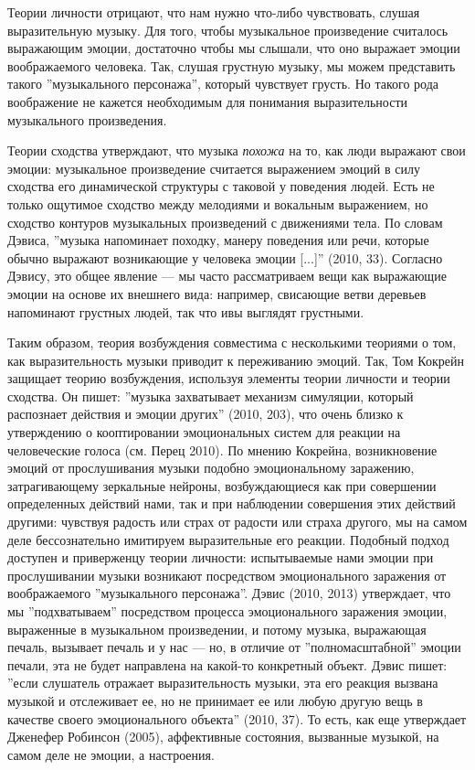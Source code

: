 \documentclass[11pt]{book}
\begin{document}
Теории личности отрицают, что нам нужно что-либо чувствовать, слушая выразительную музыку. Для того, чтобы музыкальное произведение считалось выражающим эмоции, достаточно чтобы мы слышали, что оно выражает эмоции воображаемого человека. Так, слушая грустную музыку, мы можем представить такого ''музыкального персонажа'', который чувствует грусть. Но такого рода воображение не кажется необходимым для понимания выразительности музыкального произведения.

Теории сходства утверждают, что музыка \textit{похожа} на то, как люди выражают свои эмоции: музыкальное произведение считается выражением эмоций в силу сходства его динамической структуры с таковой у поведения людей. Есть не только ощутимое сходство между мелодиями и вокальным выражением, но сходство контуров музыкальных произведений с движениями тела. По словам Дэвиса, ''музыка напоминает походку, манеру поведения или речи, которые обычно выражают возникающие у человека эмоции [...]'' (2010, 33). Согласно Дэвису, это общее явление --- мы часто рассматриваем вещи как выражающие эмоции на основе их внешнего вида: например, свисающие ветви деревьев напоминают грустных людей, так что ивы выглядят грустными.

Таким образом, теория возбуждения совместима с несколькими теориями о том, как выразительность музыки приводит к переживанию эмоций. Так, Том Кокрейн защищает теорию возбуждения, используя элементы теории личности и теории сходства. Он пишет: ''музыка захватывает механизм симуляции, который распознает действия и эмоции других'' (2010, 203), что очень близко к утверждению о кооптировании эмоциональных систем для реакции на человеческие голоса (см. Перец 2010). По мнению Кокрейна, возникновение эмоций от прослушивания музыки подобно эмоциональному заражению, затрагивающему зеркальные нейроны, возбуждающиеся как при совершении определенных действий нами, так и при наблюдении совершения этих действий другими: чувствуя радость или страх от радости или страха другого, мы на самом деле бессознательно имитируем выразительные его реакции. Подобный подход доступен и приверженцу теории личности: испытываемые нами эмоции при прослушивании музыки возникают посредством эмоционального заражения от воображаемого ''музыкального персонажа''. Дэвис (2010, 2013) утверждает, что мы ''подхватываем'' посредством процесса эмоционального заражения эмоции, выраженные в музыкальном произведении, и потому музыка, выражающая печаль, вызывает печаль и у нас --- но, в отличие от ''полномасштабной'' эмоции печали, эта не будет направлена на какой-то конкретный объект. Дэвис пишет: ''если слушатель отражает выразительность музыки, эта его реакция вызвана музыкой и отслеживает ее, но не принимает ее или любую другую вещь в качестве своего эмоционального объекта'' (2010, 37). То есть, как еще утверждает Дженефер Робинсон (2005), аффективные состояния, вызванные музыкой, на самом деле не эмоции, а настроения.
\end{document}
